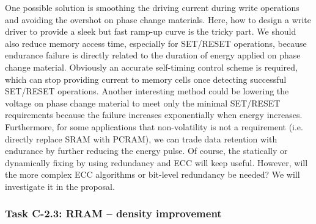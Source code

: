 One possible solution is smoothing the driving current during write operations and avoiding the overshot on phase change materials. Here, how to design a write driver to provide a sleek but fast ramp-up curve is the tricky part. We should also reduce memory access time, especially for SET/RESET operations, because endurance failure is directly related to the duration of energy applied on phase change material. Obviously an accurate self-timing control scheme is required, which can stop providing current to memory cells once detecting successful SET/RESET operations. Another interesting method could be lowering the voltage on phase change material to meet only the minimal SET/RESET requirements because the failure increases exponentially when energy increases. Furthermore, for some applications that non-volatility is not a requirement (i.e. directly replace SRAM with PCRAM), we can trade data retention with endurance by further reducing the energy pulse. Of course, the statically or dynamically fixing by using redundancy and ECC will keep useful. However, will the more complex ECC algorithms or bit-level redundancy be needed? We will investigate it in the proposal.



\subsubsection{Task C-2.3: RRAM -- density improvement}
\label{C2.3-RRAM}

